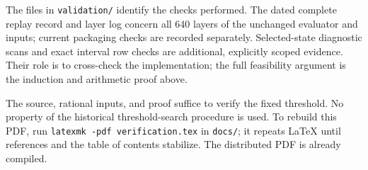 The files in \texttt{validation/} identify the checks performed. The dated
complete replay record and layer log concern all 640 layers of the unchanged
evaluator and inputs; current packaging checks are recorded separately.
Selected-state diagnostic scans and exact interval row checks are
additional, explicitly scoped evidence. Their role is to cross-check
the implementation; the full feasibility argument is the induction and
arithmetic proof above.

The source, rational inputs, and proof suffice to verify the fixed
threshold. No property of the historical threshold-search procedure is
used. To rebuild this PDF, run \texttt{latexmk -pdf verification.tex}
in \texttt{docs/}; it repeats LaTeX until references and the table of contents
stabilize. The distributed PDF is already compiled.
